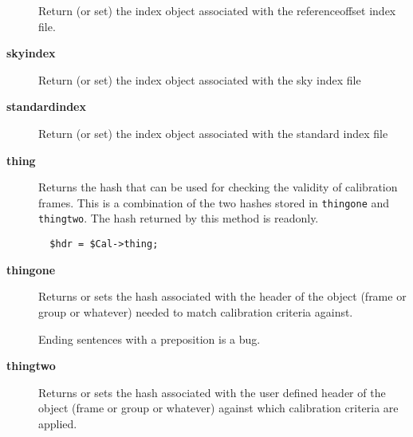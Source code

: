 \begin{description}
Return (or set) the index object associated with the referenceoffset index file.


\item[\textbf{skyindex}] \mbox{}

Return (or set) the index object associated with the sky index file


\item[\textbf{standardindex}] \mbox{}

Return (or set) the index object associated with the standard index file


\item[\textbf{thing}] \mbox{}

Returns the hash that can be used for checking the validity of
calibration frames. This is a combination of the two hashes
stored in \texttt{thingone} and \texttt{thingtwo}. The hash returned
by this method is readonly.

\begin{verbatim}
  $hdr = $Cal->thing;
\end{verbatim}

\item[\textbf{thingone}] \mbox{}

Returns or sets the hash associated with the header of the object
(frame or group or whatever) needed to match calibration criteria
against.



Ending sentences with a preposition is a bug.


\item[\textbf{thingtwo}] \mbox{}

Returns or sets the hash associated with the user defined header of
the object (frame or group or whatever) against which calibration
criteria are applied.

\end{description}
